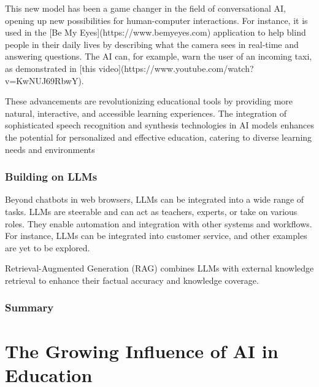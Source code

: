 \documentclass{article}
\begin{document}
This new model has been a game changer in the field of conversational AI, opening up new possibilities for human-computer interactions. For instance, it is used in the [Be My Eyes](https://www.bemyeyes.com) application to help blind people in their daily lives by describing what the camera sees in real-time and answering questions. The AI can, for example, warn the user of an incoming taxi, as demonstrated in [this video](https://www.youtube.com/watch?v=KwNUJ69RbwY).

These advancements are revolutionizing educational tools by providing more natural, interactive, and accessible learning experiences. The integration of sophisticated speech recognition and synthesis technologies in AI models enhances the potential for personalized and effective education, catering to diverse learning needs and environments

\subsubsection{Building on LLMs} %

Beyond chatbots in web browsers, LLMs can be integrated into a wide range of tasks. LLMs are steerable and can act as teachers, experts, or take on various roles. They enable automation and integration with other systems and workflows. For instance, LLMs can be integrated into customer service, and other examples are yet to be explored.

Retrieval-Augmented Generation (RAG) combines LLMs with external knowledge retrieval to enhance their factual accuracy and knowledge coverage.

\subsubsection{Summary}%


\newpage
\section{The Growing Influence of AI in Education}
\end{document}
